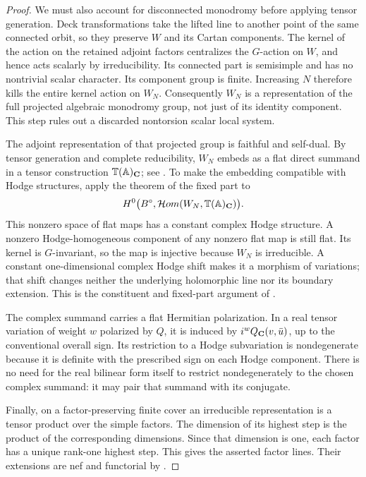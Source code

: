 \begin{proof}
We must also account for disconnected monodromy before applying
tensor generation.  Deck transformations take the lifted line to
another point of the same connected orbit, so they preserve $W$ and
its Cartan components.  The kernel of the action on the retained
adjoint factors centralizes the $G$-action on $W$, and hence acts
scalarly by irreducibility.  Its connected part is semisimple and
has no nontrivial scalar character.  Its component group is finite.
Increasing $N$ therefore kills the entire kernel action on $W_N$.
Consequently $W_N$ is a representation of the full projected
algebraic monodromy group, not just of its identity component.
This step rules out a discarded nontorsion scalar local system.

The adjoint representation of that projected group is faithful and
self-dual.  By tensor generation and complete reducibility,
$W_N$ embeds as a flat direct summand in a tensor construction
$\mathbb T(\mathbb A)_{\mathbf C}$; see
\cite[Theorem~4.14]{MilneAlgebraicGroups}.  To make the embedding
compatible with Hodge structures, apply the theorem of the fixed part
to
\[
 H^0\bigl(B^\circ,
       \mathcal Hom(W_N,\mathbb T(\mathbb A)_{\mathbf C})\bigr).
\]
This nonzero space of flat maps has a constant complex Hodge
structure.  A nonzero Hodge-homogeneous component of any nonzero
flat map is still flat.  Its kernel is $G$-invariant, so the map is
injective because $W_N$ is irreducible.  A constant one-dimensional
complex Hodge shift makes it a morphism of variations; that shift
changes neither the underlying holomorphic line nor its boundary
extension.  This is the constituent and fixed-part argument of
\cite[Theorem~3]{BakkerMatsushita}.

The complex summand carries a flat Hermitian polarization.  In a
real tensor variation of weight $w$ polarized by $Q$, it is induced
by $i^wQ_{\mathbf C}(v,\bar u)$, up to the conventional overall sign.
Its restriction to a Hodge subvariation is nondegenerate because
it is definite with the prescribed sign on each Hodge component.
There is no need for the real bilinear form itself to restrict
nondegenerately to the chosen complex summand: it may pair that
summand with its conjugate.

Finally, on a factor-preserving finite cover an irreducible
representation is a tensor product over the simple factors.  The
dimension of its highest step is the product of the corresponding
dimensions.  Since that dimension is one, each factor has a unique
rank-one highest step.  This gives the asserted factor lines.  Their
extensions are nef and functorial by
.
\end{proof}

